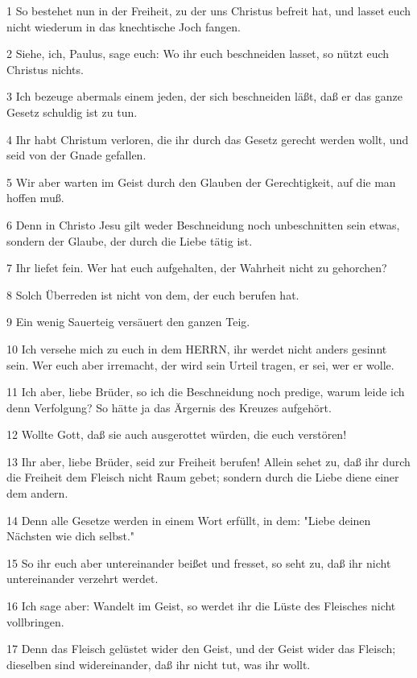 \par 1 So bestehet nun in der Freiheit, zu der uns Christus befreit hat, und lasset euch nicht wiederum in das knechtische Joch fangen.
\par 2 Siehe, ich, Paulus, sage euch: Wo ihr euch beschneiden lasset, so nützt euch Christus nichts.
\par 3 Ich bezeuge abermals einem jeden, der sich beschneiden läßt, daß er das ganze Gesetz schuldig ist zu tun.
\par 4 Ihr habt Christum verloren, die ihr durch das Gesetz gerecht werden wollt, und seid von der Gnade gefallen.
\par 5 Wir aber warten im Geist durch den Glauben der Gerechtigkeit, auf die man hoffen muß.
\par 6 Denn in Christo Jesu gilt weder Beschneidung noch unbeschnitten sein etwas, sondern der Glaube, der durch die Liebe tätig ist.
\par 7 Ihr liefet fein. Wer hat euch aufgehalten, der Wahrheit nicht zu gehorchen?
\par 8 Solch Überreden ist nicht von dem, der euch berufen hat.
\par 9 Ein wenig Sauerteig versäuert den ganzen Teig.
\par 10 Ich versehe mich zu euch in dem HERRN, ihr werdet nicht anders gesinnt sein. Wer euch aber irremacht, der wird sein Urteil tragen, er sei, wer er wolle.
\par 11 Ich aber, liebe Brüder, so ich die Beschneidung noch predige, warum leide ich denn Verfolgung? So hätte ja das Ärgernis des Kreuzes aufgehört.
\par 12 Wollte Gott, daß sie auch ausgerottet würden, die euch verstören!
\par 13 Ihr aber, liebe Brüder, seid zur Freiheit berufen! Allein sehet zu, daß ihr durch die Freiheit dem Fleisch nicht Raum gebet; sondern durch die Liebe diene einer dem andern.
\par 14 Denn alle Gesetze werden in einem Wort erfüllt, in dem: "Liebe deinen Nächsten wie dich selbst."
\par 15 So ihr euch aber untereinander beißet und fresset, so seht zu, daß ihr nicht untereinander verzehrt werdet.
\par 16 Ich sage aber: Wandelt im Geist, so werdet ihr die Lüste des Fleisches nicht vollbringen.
\par 17 Denn das Fleisch gelüstet wider den Geist, und der Geist wider das Fleisch; dieselben sind widereinander, daß ihr nicht tut, was ihr wollt.
